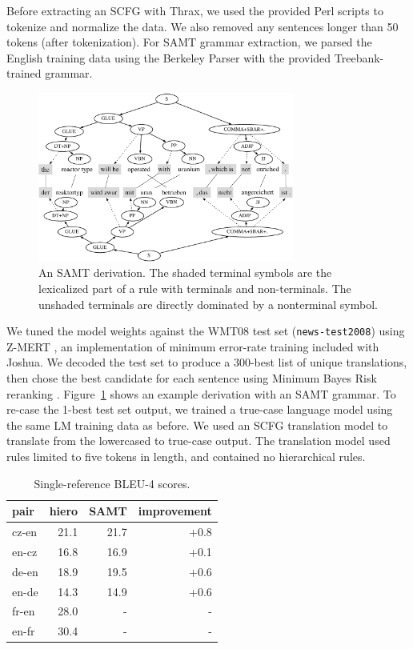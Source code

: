 \documentclass[11pt]{article}
\begin{document}
Before extracting an SCFG with Thrax, we used the provided Perl
scripts to tokenize and normalize the data. We also removed any
sentences longer than 50 tokens (after tokenization).  For SAMT
grammar extraction, 
we parsed the English training data using the Berkeley Parser
\cite{petrov2006learning} with the
provided Treebank-trained grammar.

\begin{figure}[t]
  \centering
  \includegraphics[width=0.75\textwidth]{figures/derivation}
  \caption{An SAMT derivation. The shaded terminal symbols are the lexicalized part of a rule with terminals and non-terminals. The unshaded terminals are directly dominated by a nonterminal symbol.}
  \label{figure:derivation}
\end{figure}

We tuned the model weights against the WMT08 test set ({\tt news-test2008}) using Z-MERT \cite{zaidan2009z}, an
implementation of minimum error-rate training included with Joshua.  We decoded the test set to produce a 300-best list of unique
translations, then chose the best candidate for each sentence using
Minimum Bayes Risk reranking \cite{kumar2004minimum}.
Figure~\ref{figure:derivation} shows an example derivation with an
SAMT grammar.  To re-case the 1-best test set output, we trained a true-case language
model using the same LM training data as before.  We used an SCFG
translation model to translate from the lowercased to true-case
output.  The translation model used rules limited to five tokens in length, and contained no hierarchical rules. 

\begin{table}[t]
  \centering
  \begin{tabular}{l|rrr}
    pair   & hiero & SAMT & improvement \\
    \hline\hline
    cz-en  & 21.1  & 21.7 & +0.8 \\
    en-cz  & 16.8  & 16.9 & +0.1 \\
    de-en  & 18.9  & 19.5 & +0.6 \\
    en-de  & 14.3  & 14.9 & +0.6 \\
    fr-en  & 28.0  & - & - \\
    en-fr  & 30.4  & - & - \\
  \end{tabular}
  \caption{Single-reference BLEU-4 scores.}
  \label{table:results}
\end{table}
\end{document}
